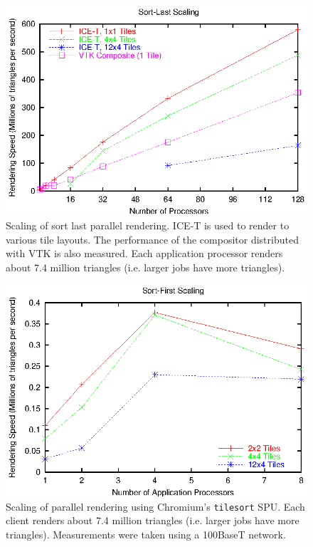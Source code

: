 \documentclass{acmsiggraph}
\newcommand{\cidentifier}[1]{\texttt{#1}}
\begin{document}
  \begin{figure}
    \includegraphics[width=\linewidth]{images/scaling_icet_weak}
    \caption{Scaling of sort last parallel rendering.  ICE-T is used to
      render to various tile layouts.  The performance of the compositor
      distributed with VTK is also measured.  Each application processor
      renders about 7.4 million triangles (i.e. larger jobs have more
      triangles).}
    \label{fig:ice-t}
  \end{figure}

  \begin{figure}
    \includegraphics[width=\linewidth]{images/scaling_chromium}
    \caption{Scaling of parallel rendering using Chromium's
      \cidentifier{tile\-sort} SPU.  Each client renders about 7.4 million
      triangles (i.e. larger jobs have more triangles).  Measurements were
      taken using a 100BaseT network.}
    \label{fig:chromium}
  \end{figure}
\end{document}

